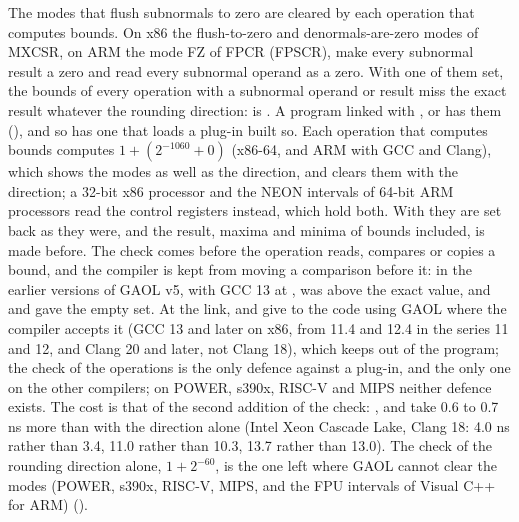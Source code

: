 \medskip
The modes that flush subnormals to zero are cleared by each operation that
computes bounds.\newinvfive{} On x86 the flush-to-zero and denormals-are-zero
modes of MXCSR, on ARM the mode FZ of FPCR (FPSCR), make every subnormal
result a zero and read every subnormal operand as a zero. With one of them
set, the bounds of every operation with a subnormal operand or result miss
the exact result whatever the rounding direction: \code{[1e-300] * [1e-20]}
is \code{[0, 0]}. A program linked with , 
or  has them (), and
so has one that loads a plug-in built so. Each operation that computes
bounds computes $1 + (2^{-1060} + 0)$ (x86-64, and ARM with GCC and Clang),
which shows the modes as well as the direction, and clears them with the
direction; a 32-bit x86 processor and the NEON intervals of 64-bit ARM
processors read the control registers instead, which hold both. With
 they are set back as they were, and the
result, maxima and minima of bounds included, is made before. The check comes
before the operation reads, compares or copies a bound, and the compiler is
kept from moving a comparison before it: in the earlier versions of GAOL v5,
with GCC 13 at ,  was
above the exact value, and  and  gave the
empty set. At the link,  and
 give  to the code using GAOL where the
compiler accepts it (GCC 13 and later on x86, from 11.4 and 12.4 in the series
11 and 12, and Clang 20 and later, not Clang 18), which keeps  out of the program; the check
of the operations is the only defence against a plug-in, and the only one on
the other compilers; on POWER, s390x, RISC-V and MIPS neither defence exists. The cost
is that of the second addition of the check: ,  and
 take 0.6 to 0.7 ns more than with the direction alone (Intel
Xeon Cascade Lake, Clang 18: 4.0 ns rather than 3.4, 11.0 rather than 10.3,
13.7 rather than 13.0). The check of the rounding direction alone,
$1 + 2^{-60}$, is the one left where GAOL cannot clear the modes (POWER,
s390x, RISC-V, MIPS, and the FPU intervals of Visual C++ for ARM)
().

